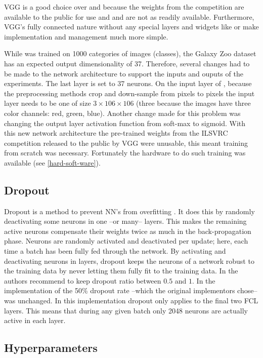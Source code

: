 VGG is a good choice over \gnet and \anet because the weights from the competition are available to the public for use and \anet and \gnet are not as readily available. Furthermore, VGG's fully connected nature without any special layers and widgets like \anet or \gnet make implementation and management much more simple. %

While \vgg was trained on 1000 categories of images (classes), the Galaxy Zoo dataset has an expected output dimensionality of 37. Therefore, several changes had to be made to the network architecture to support the inputs and ouputs of the experiments. The last layer is set to 37 neurons. On the input layer of \vgg, because the preprocessing methods crop and down-sample from  pixels to  pixels the input layer needs to be one of size $3 \times 106 \times 106$ (three because the images have three color channels: red, green, blue). Another change made for this problem was changing the output layer activation function from soft-max to sigmoid. With this new network architecture the pre-trained weights from the ILSVRC competition released to the public by VGG were unusable, this meant training from scratch was necessary. Fortunately the hardware to do such training was available (see \ref{hard-soft-ware}).

\subsection{Dropout}
Dropout is a method to prevent NN's from overfitting \cite{dropout}. It does this by randomly deactivating some neurons in one --or many-- layers. This makes the remaining active neurons compensate their weights twice as much in the back-propagation phase. Neurons are randomly activated and deactivated per update; here, each time a batch has been fully fed through the network. By activating and deactivating neurons in layers, dropout keeps the neurons of a network robust to the training data by never letting them fully fit to the training data. In \cite{dropout} the authors recommend to keep dropout ratio between $0.5$ and $1$. In the implementation of \vgg the 50\% dropout rate --which the original implementors chose-- was unchanged. In this \vgg implementation dropout only applies to the final two FCL layers. This means that during any given batch only 2048 neurons are actually active in each layer.

\subsection{Hyperparameters}

